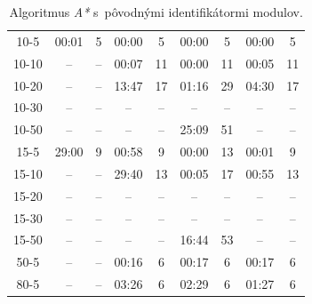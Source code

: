 \documentclass[
  printed, %
  oneside, %
  notable,   %
  nolof,     %
  nolot,     %
]{fithesis3}
\begin{document}
\begin{table}[hp!]
\begin{tabular}{c|cc|cc|cc|cc}
10-5  & 00:01 & 5  & 00:00 & 5  & \cellcolor{table-green}00:00 & \cellcolor{table-green}5  & 00:00 & 5  \\
10-10  & -- & --  & 00:07 & 11  & \cellcolor{table-green}00:00 & \cellcolor{table-green}11  & 00:05 & 11  \\
10-20  & -- & --  & 13:47 & 17  & \cellcolor{table-green}01:16 & \cellcolor{table-green}29  & 04:30 & 17  \\
10-30  & -- & --  & -- & --  & -- & --  & -- & --  \\
10-50  & -- & --  & -- & --  & \cellcolor{table-green}25:09 & \cellcolor{table-green}51  & -- & --  \\ \hline
15-5  & 29:00 & 9  & 00:58 & 9  & \cellcolor{table-green}00:00 & \cellcolor{table-green}13  & 00:01 & 9  \\
15-10  & -- & --  & 29:40 & 13  & \cellcolor{table-green}00:05 & \cellcolor{table-green}17  & 00:55 & 13  \\
15-20  & -- & --  & -- & --  & -- & --  & -- & --  \\
15-30  & -- & --  & -- & --  & -- & --  & -- & --  \\
15-50  & -- & --  & -- & --  & \cellcolor{table-green}16:44 & \cellcolor{table-green}53  & -- & --  \\ \hline
50-5  & -- & --  & \cellcolor{table-green}00:16 & \cellcolor{table-green}6  & 00:17 & 6  & 00:17 & 6  \\ \hline
80-5  & -- & --  & 03:26 & 6  & 02:29 & 6  & \cellcolor{table-green}01:27 & \cellcolor{table-green}6  \\

\end{tabular}%
\caption{Algoritmus \textit{A*} s~pôvodnými identifikátormi modulov. }
\label{tab:astar-orig}
\end{table}
\end{document}
